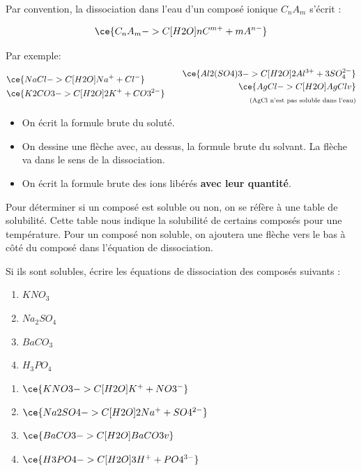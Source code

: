 \documentclass[
  11pt,
  a4paper,
  openany]{book}
\providecommand{\tightlist}{%
  \setlength{\itemsep}{0pt}\setlength{\parskip}{0pt}}
\begin{document}
Par convention, la dissociation dans l'eau d'un composé ionique \(C_nA_m\) s'écrit :

\[ \ce{C_{n}A_{m} ->C[H2O] n C^{m+} + m A^{n-}} \]

Par exemple:
\[ \begin{split}
  & \ce{NaCl ->C[H2O] Na^{+} + Cl^{-} } \\
  & \ce{K2CO3 ->C[H2O] 2 K^{+} + CO3^{2-} }
  \end{split}
  \qquad
  \begin{split}
  \ce{Al2(SO4)3 ->C[H2O] 2 Al^{3+} + 3 SO_{4}^{2-} } \\
  \ce{AgCl ->C[H2O] AgCl v } \\
  {\scriptsize \text{(AgCl n'est pas soluble dans l'eau)}}
  \end{split} \]

\begin{itemize}
\tightlist
\item
  On écrit la formule brute du soluté.
\item
  On dessine une flèche avec, au dessus, la formule brute du solvant. La flèche va dans le sens de la dissociation.
\item
  On écrit la formule brute des ions libérés \textbf{avec leur quantité}.
\end{itemize}

Pour déterminer si un composé est soluble ou non, on se réfère à une table de solubilité. Cette table nous indique la solubilité de certains composés pour une température. Pour un composé non soluble, on ajoutera une flèche vers le bas à côté du composé dans l'équation de dissociation.

\begin{Exercise}

Si ils sont solubles, écrire les équations de dissociation des composés suivants :

\begin{enumerate}
\def\labelenumi{\arabic{enumi}.}
\item
  \(KNO_3\)
\item
  \(Na_2SO_4\)
\item
  \(BaCO_3\)
\item
  \(H_3PO_4\)
\end{enumerate}

\end{Exercise}

\begin{Answer}

\begin{enumerate}
\def\labelenumi{\arabic{enumi}.}
\item
  \(\ce{KNO3 ->C[H2O] K^{+} + NO3^{-} }\)
\item
  \(\ce{Na2SO4 ->C[H2O] 2 Na^{+} + SO4^{2-} }\)
\item
  \(\ce{BaCO3 ->C[H2O] BaCO3 v }\)
\item
  \(\ce{H3PO4 ->C[H2O] 3 H^{+} + PO4^{3-} }\)
\end{enumerate}

\end{Answer}
\end{document}
